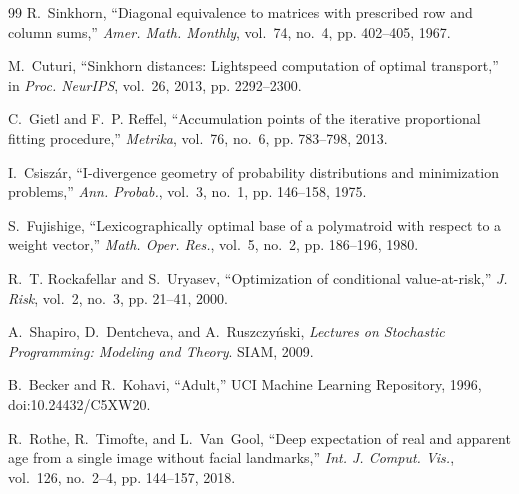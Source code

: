 \documentclass{article}
\theoremstyle{definition}
\begin{document}
\begin{thebibliography}{99}
R.~Sinkhorn, ``Diagonal equivalence to matrices with prescribed row and
column sums,'' \emph{Amer. Math. Monthly}, vol.~74, no.~4, pp. 402--405,
1967.

M.~Cuturi, ``Sinkhorn distances: Lightspeed computation of optimal
transport,'' in \emph{Proc. NeurIPS}, vol.~26, 2013, pp. 2292--2300.

C.~Gietl and F.~P. Reffel, ``Accumulation points of the iterative
proportional fitting procedure,'' \emph{Metrika}, vol.~76, no.~6,
pp. 783--798, 2013.

I.~Csisz\'ar, ``I-divergence geometry of probability distributions and
minimization problems,'' \emph{Ann. Probab.}, vol.~3, no.~1, pp. 146--158,
1975.

S.~Fujishige, ``Lexicographically optimal base of a polymatroid with
respect to a weight vector,'' \emph{Math. Oper. Res.}, vol.~5, no.~2,
pp. 186--196, 1980.

R.~T. Rockafellar and S.~Uryasev, ``Optimization of conditional
value-at-risk,'' \emph{J. Risk}, vol.~2, no.~3, pp. 21--41, 2000.

A.~Shapiro, D.~Dentcheva, and A.~Ruszczy\'nski, \emph{Lectures on
Stochastic Programming: Modeling and Theory}. SIAM, 2009.

B.~Becker and R.~Kohavi, ``Adult,'' UCI Machine Learning Repository, 1996,
doi:10.24432/C5XW20.

R.~Rothe, R.~Timofte, and L.~Van~Gool, ``Deep expectation of real and
apparent age from a single image without facial landmarks,'' \emph{Int. J.
Comput. Vis.}, vol.~126, no.~2--4, pp. 144--157, 2018.

\end{thebibliography}
\end{document}
